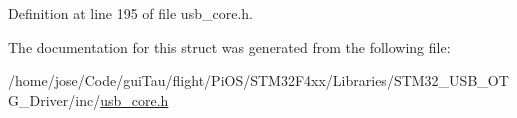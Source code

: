 Definition at line 195 of file usb\-\_\-core.\-h.



The documentation for this struct was generated from the following file\-:\begin{DoxyCompactItemize}
\item 
/home/jose/\-Code/gui\-Tau/flight/\-Pi\-O\-S/\-S\-T\-M32\-F4xx/\-Libraries/\-S\-T\-M32\-\_\-\-U\-S\-B\-\_\-\-O\-T\-G\-\_\-\-Driver/inc/\hyperlink{_s_t_m32_f4xx_2_libraries_2_s_t_m32___u_s_b___o_t_g___driver_2inc_2usb__core_8h}{usb\-\_\-core.\-h}\end{DoxyCompactItemize}
